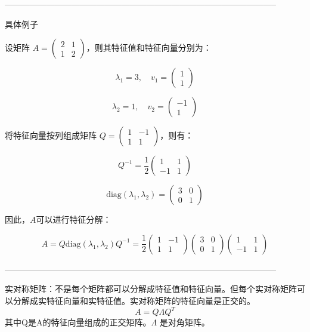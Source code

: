 \documentclass{article}
\begin{document}
--------------------------------------------------------------------------------------------------

具体例子

设矩阵 $A = \begin{pmatrix} 2 & 1 \\ 1 & 2 \end{pmatrix}$，则其特征值和特征向量分别为：

$$\lambda_1 = 3, \quad v_1 = \begin{pmatrix} 1 \\ 1 \end{pmatrix}$$

$$\lambda_2 = 1, \quad v_2 = \begin{pmatrix} -1 \\ 1 \end{pmatrix}$$

将特征向量按列组成矩阵 $Q = \begin{pmatrix} 1 & -1 \\ 1 & 1 \end{pmatrix}$，则有：

$$Q^{-1} = \frac{1}{2} \begin{pmatrix} 1 & 1 \\ -1 & 1 \end{pmatrix}$$

$$\text{diag}(\lambda_1, \lambda_2) = \begin{pmatrix} 3 & 0 \\ 0 & 1 \end{pmatrix}$$

因此，$A$可以进行特征分解：

$$A = Q \text{diag}(\lambda_1, \lambda_2) Q^{-1} = \frac{1}{2} \begin{pmatrix} 1 & -1 \\ 1 & 1 \end{pmatrix} \begin{pmatrix} 3 & 0 \\ 0 & 1 \end{pmatrix} \begin{pmatrix} 1 & 1 \\ -1 & 1 \end{pmatrix}$$

--------------------------------------------------------------------------------------------------

实对称矩阵：不是每个矩阵都可以分解成特征值和特征向量。但每个实对称矩阵可以分解成实特征向量和实特征值。实对称矩阵的特征向量是正交的。
$$A = Q \Lambda Q^T$$
其中Q是A的特征向量组成的正交矩阵。$\Lambda$ 是对角矩阵。
\end{document}
